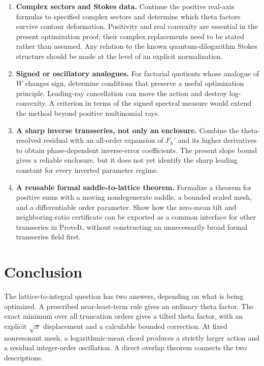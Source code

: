 \documentclass[11pt,a4paper]{article}
\numberwithin{equation}{section}
\theoremstyle{definition}\newtheorem{definition}[theorem]{Definition}
\theoremstyle{remark}\newtheorem{remark}[theorem]{Remark}
\begin{document}
\begin{enumerate}[leftmargin=*,label=\textbf{Q\arabic*.},itemsep=7pt]
\item \textbf{Complex sectors and Stokes data.}
Continue the positive real-axis formulas to specified complex sectors
and determine which theta factors survive contour deformation. Positivity
and real convexity are essential in the present optimization proof; their
complex replacements need to be stated rather than assumed. Any relation
to the known quantum-dilogarithm Stokes structure should be made at the
level of an explicit normalization.

\item \textbf{Signed or oscillatory analogues.}
For factorial quotients whose analogue of $W$ changes sign, determine
conditions that preserve a useful optimization principle. Leading-ray
cancellation can move the action and destroy log-convexity. A criterion
in terms of the signed spectral measure would extend the method beyond
positive multinomial rays.

\item \textbf{A sharp inverse transseries, not only an enclosure.}
Combine the theta-resolved residual with an all-order expansion of
$F_h'$ and its higher derivatives to obtain phase-dependent inverse-error
coefficients. The present slope bound gives a reliable enclosure, but it
does not yet identify the sharp leading constant for every inverted
parameter regime.

\item \textbf{A reusable formal saddle-to-lattice theorem.}
Formalize a theorem for positive sums with a moving nondegenerate saddle,
a bounded scaled mesh, and a differentiable order parameter. Show how the
zero-mean tilt and neighboring-ratio certificate can be exported as a
common interface for other transseries in ProveIt, without constructing
an unnecessarily broad formal transseries field first.
\end{enumerate}

\section{Conclusion}
The lattice-to-integral question has two answers, depending on what is
being optimized. A prescribed near-least-term rule gives an ordinary
theta factor. The exact minimum over all truncation orders gives a tilted
theta factor, with an explicit $\sqrt x$ displacement and a calculable
bounded correction. At fixed nonresonant mesh, a logarithmic-mean chord
produces a strictly larger action and a residual integer-order oscillation.
A direct overlap theorem connects the two descriptions.
\end{document}
